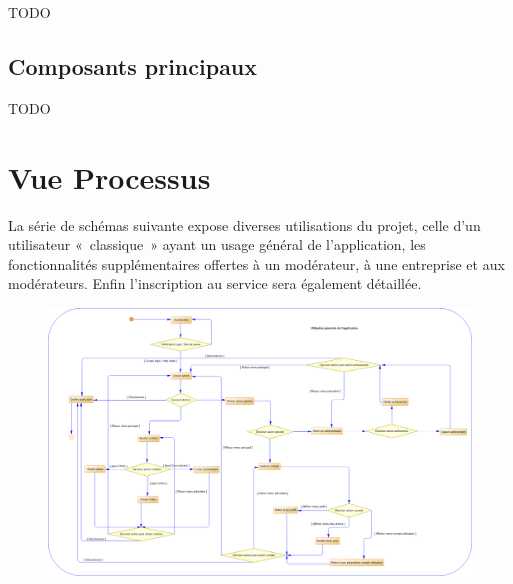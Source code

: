 \documentclass{life-fr}
\begin{document}
TODO

\section{Composants principaux}

TODO


\chapter{Vue Processus}

La série de schémas suivante expose diverses utilisations du projet, celle d'un utilisateur «~classique~» ayant un usage général de l'application, les fonctionnalités supplémentaires offertes à un modérateur, à une entreprise et aux modérateurs. Enfin l'inscription au service sera également détaillée.

\begin{figure}[H]
  \begin{center}
    \includegraphics[width=17cm]{img/processus_principaux_2.png}
  \end{center}
\end{figure}

\newpage
\end{document}
